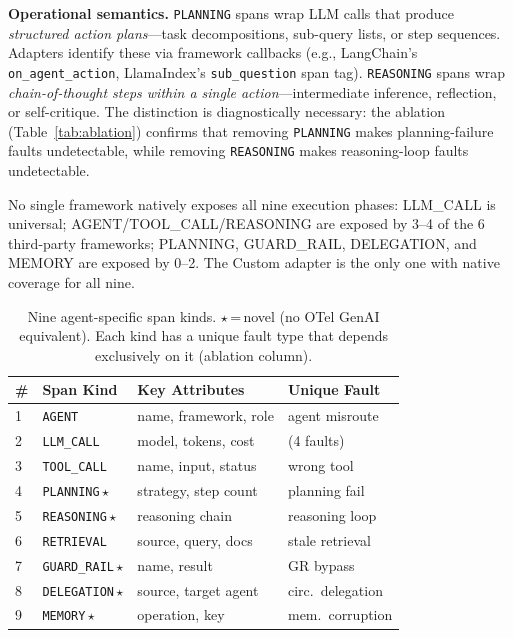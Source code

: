 \documentclass[sigconf,screen]{acmart}
\begin{document}
\textbf{Operational semantics.}
\texttt{PLANNING} spans wrap LLM calls that produce \emph{structured
action plans}---task decompositions, sub-query lists, or step
sequences.  Adapters identify these via framework callbacks
(e.g., LangChain's \texttt{on\_agent\_action}, LlamaIndex's
\texttt{sub\_question} span tag).  \texttt{REASONING} spans wrap
\emph{chain-of-thought steps within a single action}---intermediate
inference, reflection, or self-critique.  The distinction is
diagnostically necessary: the ablation (Table~\ref{tab:ablation})
confirms that removing \texttt{PLANNING} makes planning-failure faults
undetectable, while removing \texttt{REASONING} makes reasoning-loop
faults undetectable.

No single framework natively exposes all nine execution phases:
LLM\_CALL is universal; AGENT/TOOL\_CALL/REASONING are exposed by
3--4 of the 6 third-party frameworks; PLANNING, GUARD\_RAIL,
DELEGATION, and MEMORY are exposed by 0--2.  The Custom adapter is
the only one with native coverage for all nine.

\begin{table}[t]
\centering
\scriptsize
\caption{Nine agent-specific span kinds.  $\star$\,=\,novel (no OTel
GenAI equivalent).  Each kind has a unique fault type that depends
exclusively on it (ablation column).}
\label{tab:spantaxonomy}
\begin{tabular}{@{}llll@{}}
\toprule
\textbf{\#} & \textbf{Span Kind} & \textbf{Key Attributes} & \textbf{Unique Fault} \\
\midrule
1 & \texttt{AGENT}      & name, framework, role & agent misroute \\
2 & \texttt{LLM\_CALL}  & model, tokens, cost & (4 faults) \\
3 & \texttt{TOOL\_CALL} & name, input, status & wrong tool \\
4 & \texttt{PLANNING}\,$\star$   & strategy, step count & planning fail \\
5 & \texttt{REASONING}\,$\star$  & reasoning chain & reasoning loop \\
6 & \texttt{RETRIEVAL}  & source, query, docs & stale retrieval \\
7 & \texttt{GUARD\_RAIL}\,$\star$& name, result & GR bypass \\
8 & \texttt{DELEGATION}\,$\star$ & source, target agent & circ.\ delegation \\
9 & \texttt{MEMORY}\,$\star$     & operation, key & mem.\ corruption \\
\bottomrule
\end{tabular}
\end{table}
\end{document}
